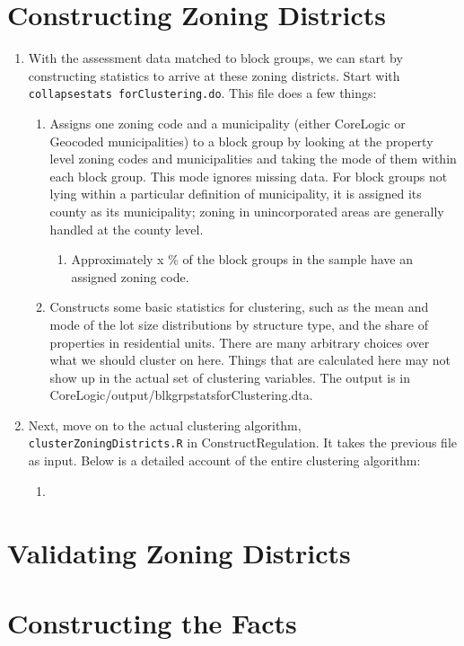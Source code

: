 \documentclass[]{article}
\begin{document}
\section{Constructing Zoning Districts}
\begin{enumerate}
	\item With the assessment data matched to block groups, we can start by constructing statistics to arrive at these zoning districts. Start with \texttt{collapse\textunderscore stats \textunderscore forClustering.do}. This file does a few things:
	\begin{enumerate}
		\item Assigns one zoning code and a municipality (either CoreLogic or Geocoded municipalities) to a block group by looking at the property level zoning codes and municipalities and taking the mode of them within each block group. This mode ignores missing data. For block groups not lying within a particular definition of municipality, it is assigned its county as its municipality; zoning in unincorporated areas are generally handled at the county level. 
		\begin{enumerate}
			\item Approximately x \% of the block groups in the sample have an assigned zoning code. 
		\end{enumerate}
		
		\item Constructs some basic statistics for clustering, such as the mean and mode of the lot size distributions by structure type, and the share of properties in residential units. There are many arbitrary choices over what we should cluster on here. Things that are calculated here may not show up in the actual set of clustering variables. The output is in CoreLogic/output/blkgrpstats\textunderscore forClustering.dta.
	\end{enumerate}

	\item Next, move on to the actual clustering algorithm, \texttt{cluster\textunderscore ZoningDistricts.R} in Construct\textunderscore Regulation. It takes the previous file as input. Below is a detailed account of the entire clustering algorithm:
	\begin{enumerate}
		\item 
	\end{enumerate}
\end{enumerate}

\section{Validating Zoning Districts}

\section{Constructing the Facts}
\end{document}
